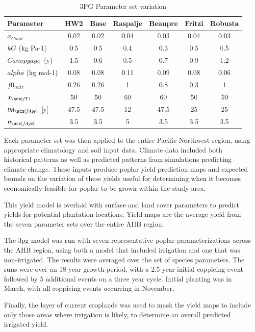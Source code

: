 \documentclass[preprint,12pt]{elsarticle}
\begin{document}
\begin{table}%
\caption{3PG Parameter set variation}
\begin{tabularx}{\linewidth}{|Xcccccc|}
\hline
 Parameter & HW2 & Base & Raspalje & Beaupre & Fritzi & Robusta\\
  \hline   
  $x_{Cond}$  & 0.02 & 0.02 & 0.04 & 0.03 & 0.04 & 0.03 \\
  $kG$ (kg Pa-1) & 0.5 & 0.5 & 0.4 & 0.3 & 0.5 & 0.5 \\
  $Canopy age$~(y) & 1.5 & 0.6 & 0.5 & 0.7 & 0.9 & 1.2 \\
  $alpha$ (kg mol-1) & 0.08 & 0.08 & 0.11 & 0.09 & 0.08 & 0.06 \\
  $f0_{nutr}$  & 0.26 & 0.26 & 1 & 0.8 & 0.3 & 1 \\
  $x_{\acs{fT}}$ & 50 & 50 & 60 & 60 & 50 & 50 \\
  $tm_{\acs{fAge}}$ [y] & 47.5 & 47.5 & 12 & 47.5 & 25  & 25 \\
  $n_{\acs{fAge}}$ & 3.5 & 3.5 & 5 & 3.5 & 3.5 & 3.5 \\
  \hline
\end{tabularx}
\label{tab:3pg-tree-parameters-vary}
 \end{table}

 Each parameter set was then applied to the entire Pacific Northwest
 region, using appropriate climatology and soil input data.  Climate
 data included both historical patterns as well as predicted patterns
 from simulations predicting climate change.  These inputs produce
 poplar yield prediction maps and expected bounds on the variation of
 these yields useful for determining when it becomes economically
 feasible for poplar to be grown within the study area.

This yield model is overlaid with surface and land cover
parameters to predict yields for potential plantation locations.
Yield maps are the average yield from the seven parameter sets over the
entire \ac{AHB} region. 

The \ac{3pg} model was run with seven representative poplar
parameterizations across the \ac{AHB} region, using both a
model that included irrigation and one that was non-irrigated.  The
results were averaged over the set of species parameters.  The runs
were over an 18 year growth period, with a 2.5 year initial coppicing
event followed by 5 additional events on a three year cycle.  Initial
planting was in March, with all coppicing events occurring in
November.

Finally, the layer of current croplands was used to mask the yield
maps to include only those areas where irrigation is likely, to
determine an overall predicted irrigated yield.
\end{document}
